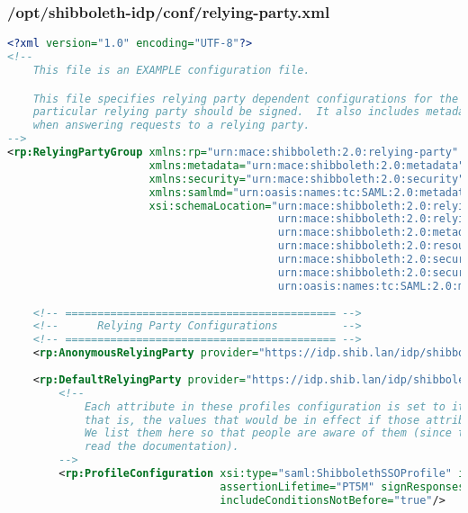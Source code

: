 \subsubsection{/opt/shibboleth-idp/conf/relying-party.xml}
\begin{lstlisting}[language=xml]
<?xml version="1.0" encoding="UTF-8"?>
<!--
    This file is an EXAMPLE configuration file.

    This file specifies relying party dependent configurations for the IdP, for example, whether SAML assertions to a 
    particular relying party should be signed.  It also includes metadata provider and credential definitions used 
    when answering requests to a relying party.
-->
<rp:RelyingPartyGroup xmlns:rp="urn:mace:shibboleth:2.0:relying-party" xmlns:saml="urn:mace:shibboleth:2.0:relying-party:saml" 
                      xmlns:metadata="urn:mace:shibboleth:2.0:metadata" xmlns:resource="urn:mace:shibboleth:2.0:resource" 
                      xmlns:security="urn:mace:shibboleth:2.0:security" xmlns:samlsec="urn:mace:shibboleth:2.0:security:saml" 
                      xmlns:samlmd="urn:oasis:names:tc:SAML:2.0:metadata" xmlns:xsi="http://www.w3.org/2001/XMLSchema-instance" 
                      xsi:schemaLocation="urn:mace:shibboleth:2.0:relying-party classpath:/schema/shibboleth-2.0-relying-party.xsd
                                          urn:mace:shibboleth:2.0:relying-party:saml classpath:/schema/shibboleth-2.0-relying-party-saml.xsd
                                          urn:mace:shibboleth:2.0:metadata classpath:/schema/shibboleth-2.0-metadata.xsd
                                          urn:mace:shibboleth:2.0:resource classpath:/schema/shibboleth-2.0-resource.xsd 
                                          urn:mace:shibboleth:2.0:security classpath:/schema/shibboleth-2.0-security.xsd
                                          urn:mace:shibboleth:2.0:security:saml classpath:/schema/shibboleth-2.0-security-policy-saml.xsd
                                          urn:oasis:names:tc:SAML:2.0:metadata classpath:/schema/saml-schema-metadata-2.0.xsd">
                                       
    <!-- ========================================== -->
    <!--      Relying Party Configurations          -->
    <!-- ========================================== -->
    <rp:AnonymousRelyingParty provider="https://idp.shib.lan/idp/shibboleth" defaultSigningCredentialRef="IdPCredential"/>
    
    <rp:DefaultRelyingParty provider="https://idp.shib.lan/idp/shibboleth" defaultSigningCredentialRef="IdPCredential">
        <!-- 
            Each attribute in these profiles configuration is set to its default value,
            that is, the values that would be in effect if those attributes were not present.
            We list them here so that people are aware of them (since they seem reluctant to 
            read the documentation).
        -->
        <rp:ProfileConfiguration xsi:type="saml:ShibbolethSSOProfile" includeAttributeStatement="false" 
                                 assertionLifetime="PT5M" signResponses="conditional" signAssertions="never"
                                 includeConditionsNotBefore="true"/>
                              

\end{lstlisting}
